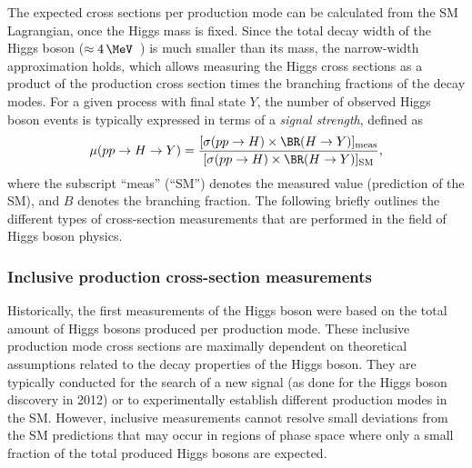 

The expected cross sections per production mode can be calculated from the SM Lagrangian, once the Higgs mass is fixed.
Since the total decay width of the Higgs boson ($\approx 4\,\MeV$~\cite{deFlorian:2016spz}) is much smaller than its mass, the narrow-width approximation holds, which allows measuring the Higgs cross sections as a product of the production cross section times the branching fractions of the decay modes.
For a given process with final state $Y$, the number of observed Higgs boson events is typically expressed in terms of a \emph{signal strength}, defined as 
\begin{equation}
  \label{eq:signal-strength}
  \mu(pp \to H \to Y) = \frac{ [ \sigma(pp \to H)  \times \BR(H \to Y) ]_\text{meas} } { [ \sigma(pp \to H) \times \BR(H \to Y) ]_\text{SM}},
\end{equation}
where the subscript ``meas'' (``SM'') denotes the measured value (prediction of the SM), and $B$ denotes the branching fraction. 
The following briefly outlines the different types of cross-section measurements that are performed in the field of Higgs boson physics. 


\subsubsection{Inclusive production cross-section measurements}
Historically, the first measurements of the Higgs boson were based on the total amount of Higgs bosons produced per production mode.
These inclusive production mode cross sections are maximally dependent on theoretical assumptions related to the decay properties of the Higgs boson.
They are typically conducted for the search of a new signal (as done for the Higgs boson discovery in 2012) or to experimentally establish different production modes in the SM.
However, inclusive measurements cannot resolve small deviations from the SM predictions that may occur in regions of phase space where only a small fraction of the total produced Higgs bosons are expected.

